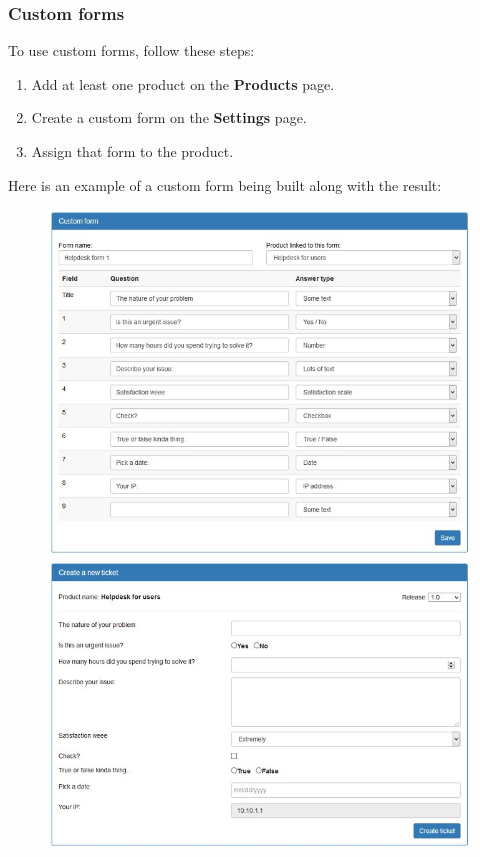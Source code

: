 \documentclass[11pt]{article}
\begin{document}
\subsubsection{Custom forms}
To use custom forms, follow these steps:

\begin{enumerate}
\item Add at least one product on the \textbf{Products} page.
\item Create a custom form on the \textbf{Settings} page.
\item Assign that form to the product.
\end{enumerate}

Here is an example of a custom form being built along with the result:

\begin{figure}[h]
\includegraphics[scale=0.5]{customform.jpg}
\includegraphics[scale=0.5]{customform2.jpg}
\end{figure}
\end{document}
